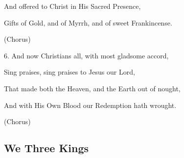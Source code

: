 \begin{description}[nosep,leftmargin=\parindent,labelsep=0pt]
\item And offered to Christ in His Sacred Presence, 
\item Gifts of Gold, and of Myrrh, and of sweet Frankincense. 
\item (Chorus) 
\vspace{1.5ex}
\item 6. And now Christians all, with most gladsome accord, 
\item Sing praises, sing praises to Jesus our Lord, 
\item That made both the Heaven, and the Earth out of nought, 
\item And with His Own Blood our Redemption hath wrought. 
\item (Chorus) 
\end{description}
\subsection{We Three Kings}\label{we_three_kings}
